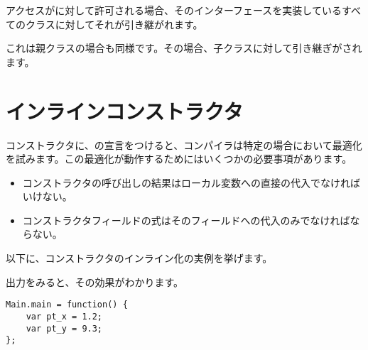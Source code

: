 
アクセスがに対して許可される場合、そのインターフェースを実装しているすべてのクラスに対してそれが引き継がれます。


これは親クラスの場合も同様です。その場合、子クラスに対して引き継ぎがされます。


\section{インラインコンストラクタ}
\label{lf-inline-constructor}

コンストラクタに、の宣言をつけると、コンパイラは特定の場合において最適化を試みます。この最適化が動作するためにはいくつかの必要事項があります。

\begin{itemize}
	\item コンストラクタの呼び出しの結果はローカル変数への直接の代入でなければいけない。
	\item コンストラクタフィールドの式はそのフィールドへの代入のみでなければならない。
\end{itemize}

以下に、コンストラクタのインライン化の実例を挙げます。


出力をみると、その効果がわかります。

\begin{lstlisting}
Main.main = function() {
	var pt_x = 1.2;
	var pt_y = 9.3;
};
\end{lstlisting}
